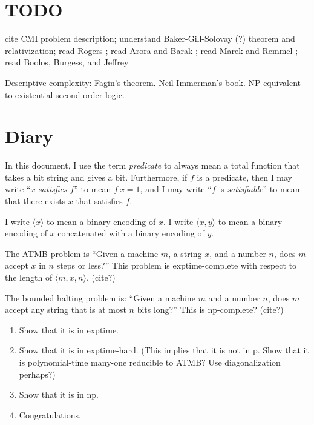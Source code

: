 \section{TODO}

cite CMI problem description;
understand Baker-Gill-Solovay (?) theorem and relativization;
read Rogers \cite{Rogers1987};
read Arora and Barak \cite{Arora2009};
read Marek and Remmel \cite{Marek2009};
read Boolos, Burgess, and Jeffrey \cite{Boolos2002}

Descriptive complexity: Fagin's theorem.
Neil Immerman's book.
NP equivalent to existential second-order logic.

\section{Diary}

In this document, I use the term \emph{predicate} to always mean
a total function that takes a bit string and gives a bit.
Furthermore, if $f$ is a predicate, then
I may write ``$x$ \emph{satisfies} $f$'' to mean $f~x = 1$, and
I may write ``$f$ is \emph{satisfiable}'' to mean
that there exists $x$ that satisfies $f$.

\newcommand\encoding[1]{\langle#1\rangle}

I write $\encoding{x}$ to mean a binary encoding of $x$.
I write $\encoding{x,y}$ to mean a binary encoding of $x$
concatenated with a binary encoding of $y$.

The ATMB problem is ``Given a machine $m$, a string $x$,
and a number $n$,
does $m$ accept $x$ in $n$ steps or less?''
This problem is exptime-complete with respect to the length of
$\encoding{m,x,n}$. (cite?)

The bounded halting problem is:
``Given a machine $m$ and a number $n$,
does $m$ accept any string that is at most $n$ bits long?''
This is np-complete? (cite?)

\begin{enumerate}
\item Show that it is in exptime.
\item Show that it is in exptime-hard.
(This implies that it is not in p.
Show that it is polynomial-time many-one reducible to ATMB?
Use diagonalization perhaps?)
\item Show that it is in np.
\item Congratulations.
\end{enumerate}

